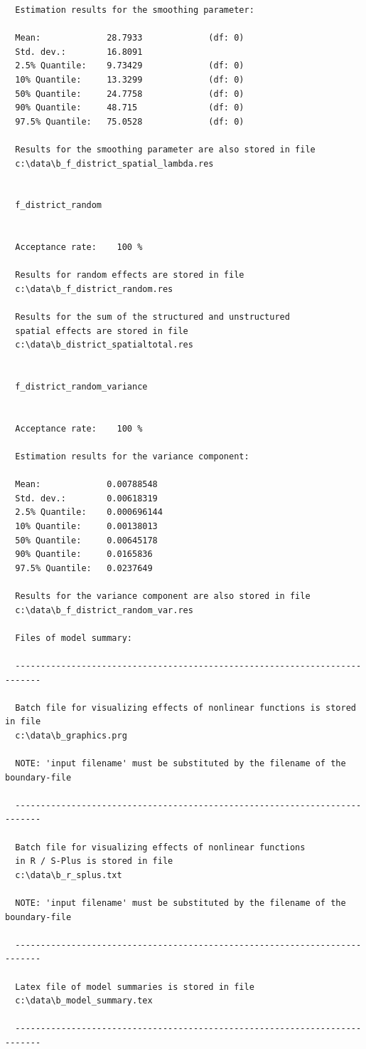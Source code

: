 \begin{verbatim}
  Estimation results for the smoothing parameter:

  Mean:             28.7933             (df: 0)
  Std. dev.:        16.8091
  2.5% Quantile:    9.73429             (df: 0)
  10% Quantile:     13.3299             (df: 0)
  50% Quantile:     24.7758             (df: 0)
  90% Quantile:     48.715              (df: 0)
  97.5% Quantile:   75.0528             (df: 0)

  Results for the smoothing parameter are also stored in file
  c:\data\b_f_district_spatial_lambda.res


  f_district_random


  Acceptance rate:    100 %

  Results for random effects are stored in file
  c:\data\b_f_district_random.res

  Results for the sum of the structured and unstructured
  spatial effects are stored in file
  c:\data\b_district_spatialtotal.res


  f_district_random_variance


  Acceptance rate:    100 %

  Estimation results for the variance component:

  Mean:             0.00788548
  Std. dev.:        0.00618319
  2.5% Quantile:    0.000696144
  10% Quantile:     0.00138013
  50% Quantile:     0.00645178
  90% Quantile:     0.0165836
  97.5% Quantile:   0.0237649

  Results for the variance component are also stored in file
  c:\data\b_f_district_random_var.res

  Files of model summary:

  ---------------------------------------------------------------------------

  Batch file for visualizing effects of nonlinear functions is stored in file
  c:\data\b_graphics.prg

  NOTE: 'input filename' must be substituted by the filename of the boundary-file

  ---------------------------------------------------------------------------

  Batch file for visualizing effects of nonlinear functions
  in R / S-Plus is stored in file
  c:\data\b_r_splus.txt

  NOTE: 'input filename' must be substituted by the filename of the boundary-file

  ---------------------------------------------------------------------------

  Latex file of model summaries is stored in file
  c:\data\b_model_summary.tex

  ---------------------------------------------------------------------------
\end{verbatim}
\normalsize

